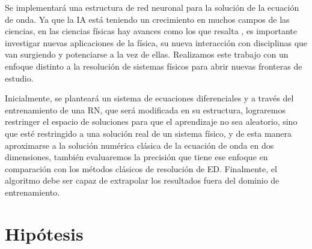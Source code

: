 Se implementará una estructura de red neuronal para la solución de la ecuación de onda. Ya que la IA está teniendo un crecimiento en muchos campos de las ciencias, en las ciencias físicas hay avances como los que resalta  \cite{Karniadakis2021}, es importante investigar nuevas aplicaciones de la física, su nueva interacción con disciplinas que van surgiendo y potenciarse a la vez de ellas. Realizamos este trabajo con un enfoque distinto a la resolución de sistemas físicos para abrir nuevas fronteras de estudio.

Inicialmente, se planteará un sistema de ecuaciones diferenciales y a través del entrenamiento de una RN, que será modificada en su estructura, lograremos restringer el espacio de soluciones para que el aprendizaje no sea aleatorio, sino que esté restringido a una solución real de un sistema físico, y de esta manera aproximarse a la solución numérica clásica de la ecuación de onda en dos dimensiones, también evaluaremos la precisión que tiene ese enfoque en comparación con los métodos clásicos de resolución de ED. Finalmente, el algoritmo debe ser capaz de extrapolar los resultados fuera del dominio de entrenamiento.







% 
% 
% 
% 

\section{Hipótesis}



